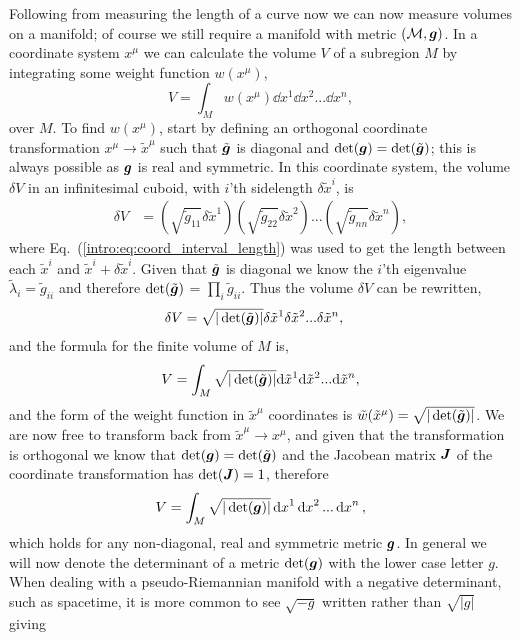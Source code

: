 Following from measuring the length of a curve now we can now measure volumes on a manifold; of course we still require a manifold with metric $(\mathcal{M},\boldsymbol{g})$. In a coordinate system $x^\mu$ we can calculate the volume $V$ of a subregion $M$ by integrating some weight function $w(x^\mu)$,
\begin{equation}
V = \int_{M} w(x^\mu) \dd x^1 \dd x^2 ... \dd x^n,
\end{equation}
over $M$. To find $w(x^\mu)$, start by defining an orthogonal coordinate transformation $x^\mu \rightarrow \tilde{x}^\mu$ such that $\tilde{\boldsymbol{g}}$ is diagonal and $\det(\boldsymbol{g})=\det(\tilde{\boldsymbol{g}})$; this is always possible as $\boldsymbol{g}$ is real and symmetric. In this coordinate system, the volume $\delta V$ in an infinitesimal cuboid, with $i$'th sidelength $\delta \tilde{x}^i$, is
\begin{align}
\delta V &=  \left( \sqrt{\tilde{g}_{11}}\delta \tilde{x}^1 \right)\left(\sqrt{\tilde{g}_{22}}\delta \tilde{x}^2 \right)... \left(\sqrt{\tilde{g}_{nn}}\delta \tilde{x}^n\right) , 
\end{align}
where Eq.~(\ref{intro:eq:coord_interval_length}) was used to get the length between each $\tilde{x}^i$ and $\tilde{x}^i + \delta \tilde{x}^i$. Given that $\tilde{\boldsymbol{g}}$ is diagonal we know the $i$'th eigenvalue $\tilde{\lambda}_i = \tilde{g}_{ii}$ and therefore $\det(\tilde{\boldsymbol{g}})$ = $\prod_i \tilde{g}_{ii}$. Thus the volume $\delta V$ can be rewritten,
\begin{align}
\delta V &=  \sqrt{|\det(\tilde{\boldsymbol{g}})|}\delta \tilde{x}^1 \delta \tilde{x}^2  ... \delta \tilde{x}^n , 
\end{align} 
and the formula for the finite volume of $M$ is,
\begin{equation} \label{intro:eq:volume_curved}
V = \int_{M} \sqrt{|\det(\tilde{\boldsymbol{g}})|} \dd \tilde{x}^1 \dd \tilde{x}^2 ... \dd \tilde{x}^n,
\end{equation}
and the form of the weight function in $\tilde{x}^\mu$ coordinates is $\tilde{w}(\tilde{x}^\mu)= \sqrt{|\det(\tilde{\boldsymbol{g}})|}$.
We are now free to transform back from $\tilde{x}^\mu\rightarrow x^\mu$, and given that the transformation is orthogonal we know that $\det(\boldsymbol{g})=\det(\tilde{\boldsymbol{g}})$ and the Jacobean matrix $\boldsymbol{J}$ of the coordinate transformation has $\det({\boldsymbol{J}})=1$, therefore
\begin{equation}\label{intro:eq:volume_curved2}
V = \int_{M} \sqrt{|\det({\boldsymbol{g}})|} \dd {x}^1 \dd {x}^2 ... \dd {x}^n,
\end{equation}
which holds for any non-diagonal, real and symmetric metric $\boldsymbol{g}$. In general we will now denote the determinant of a metric $\det(\boldsymbol{g})$ with the lower case letter $g$. When dealing with a pseudo-Riemannian manifold with a negative determinant, such as spacetime, it is more common to see $\sqrt{-g}$ written rather than $\sqrt{|g|}$ giving
